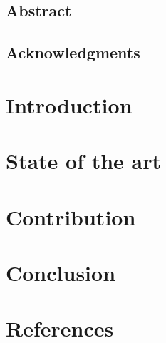 \documentclass{csereport}
\begin{document}
\maketitle

\section*{Abstract}



\cleardoublepage
\section*{Acknowledgments}



\cleardoublepage
\tableofcontents


\cleardoublepage
{}
\setcounter{page}{1}

\chapter{Introduction}



\chapter{State of the art}



\chapter{Contribution}



\chapter{Conclusion}



\chapter*{References}



\begingroup
	\renewcommand{\chapter}[2]{}
	
	
\endgroup
\end{document}
